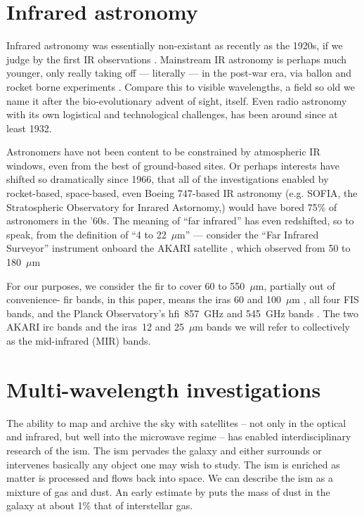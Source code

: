   \section{Infrared astronomy}

    Infrared astronomy was essentially non-existant as recently as the 1920s, if we judge by the first IR observations \citep{pettit22, pettit28}. Mainstream IR astronomy is perhaps much younger, only really taking off --- literally --- in the post-war era, via ballon and rocket borne experiments \citep{johnson66}. Compare this to visible wavelengths, a field so old we name it after the bio-evolutionary advent of sight, itself. Even radio astronomy with its own logistical and technological challenges, has been around since at least 1932.

    Astronomers have not been content to be constrained by atmospheric IR windows, even from the best of ground-based sites. Or perhaps interests have shifted so dramatically since 1966, that all of the investigations enabled by rocket-based, space-based, even Boeing 747-based IR astronomy (e.g. SOFIA, the Stratospheric Observatory for Inrared Astornomy,\cite{young12}) would have bored 75\% of astronomers in the '60s. The meaning of ``far infrared'' has even redshifted, so to speak, from the \cite{johnson66} definition of ``4 to 22~$\mu$m'' --- consider the ``Far Infrared Surveyor'' instrument onboard the AKARI satellite \citep{akari07}, which observed from 50 to 180~$\mu$m \citep{kawada07}

     For our purposes, we consider the \gls{fir} to cover 60 to 550~$\mu$m, partially out of convenience- \gls{fir} bands, in this paper, means the \gls{iras} 60 and 100~$\mu$m \citep{iras84}, all four FIS bands, and the Planck Observatory's \gls{hfi}~857~GHz and 545~GHz bands \citep{planckEarly11I, hfi14viii}. The two AKARI \gls{irc} \citep{irc07,ishihara10} bands and the \gls{iras}~12 and 25~$\mu$m bands we will refer to collectively as the mid-infrared (MIR) bands.

 \section{Multi-wavelength investigations}

     The ability to map and archive the sky with satellites -- not only in the optical and infrared, but well into the microwave regime -- has enabled interdisciplinary research of the \gls{ism}. The \gls{ism} pervades the galaxy and either surrounds or intervenes basically any object one may wish to study. The \gls{ism} is enriched as matter is processed and flows back into space. We can describe the \gls{ism} as a mixture of gas and dust. An early estimate by \cite{knapp74} puts the mass of dust in the galaxy at about 1\% that of interstellar gas.

